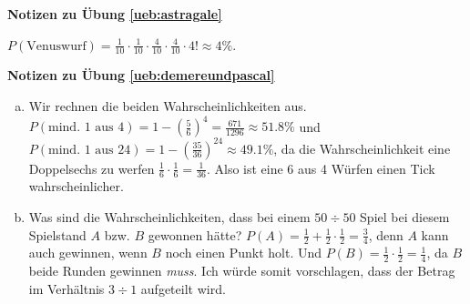 \documentclass[%
<<<<<<< Updated upstream
11pt,%
twoside,%
titlepage,%
german,%
=======
11pt,%
twoside,%
titlepage,%
swissgerman,%
>>>>>>> Stashed changes
headsepline%
]{scrartcl}
\newcommand{\faReturnGray}{\textcolor{gray}{\faMailReply}} %
\theoremstyle{definition}
\theoremstyle{plain}
\newcommand{\concatueb}[1]{ueb:#1}%
\newcommand{\concatlsg}[1]{lsg:#1}%
\newenvironment{lsg}[1]{%
    \par\noindent\textbf{Notizen zu Übung \ref{\concatueb{#1}}}\label{\concatlsg{#1}}
    \hfill\hyperref[\concatueb{#1}]{\faReturnGray}\par %
}{%
    \par%
}
\newcommand{\concatueb}[1]{ueb:#1}%
\newcommand{\concatlsg}[1]{lsg:#1}%
\newenvironment{lsg}[1]{%
    \par\noindent\textbf{Notizen zu Übung \ref{\concatueb{#1}}.}%
    \label{\concatlsg{#1}}
}{%
    \par%
}
\begin{document}
 
 \begin{lsg}{astragale}
$P(\text{Venuswurf})=\frac{1}{10}\cdot\frac{1}{10}\cdot\frac{4}{10}\cdot\frac{4}{10}\cdot4!\approx4\%$.
 \end{lsg}


\begin{lsg}{demereundpascal}
\begin{enumerate}[a)]
\item Wir rechnen die beiden Wahrscheinlichkeiten aus. $P(\text{mind. 1 aus 4})=1-\left(\frac{5}{6}\right)^{4}=\frac{671}{1296}\approx51.8\%$ und $P(\text{mind. 1 aus 24})=1-\left(\frac{35}{36}\right)^{24}\approx49.1\%$, da die Wahrscheinlichkeit eine Doppelsechs zu werfen $\frac{1}{6}\cdot\frac{1}{6}=\frac{1}{36}$. Also ist eine 6 aus 4 W\"urfen einen Tick wahrscheinlicher.
\item Was sind die Wahrscheinlichkeiten, dass bei einem $50\div50$ Spiel bei diesem Spielstand $A$ bzw. $B$ gewonnen h\"atte? $P(A)=\frac{1}{2}+\frac{1}{2}\cdot\frac{1}{2}=\frac{3}{4}$, denn $A$ kann auch gewinnen, wenn $B$ noch einen Punkt holt. Und $P(B)=\frac{1}{2}\cdot\frac{1}{2}=\frac{1}{4}$, da $B$ beide Runden gewinnen \emph{muss}. Ich w\"urde somit vorschlagen, dass der Betrag im Verh\"altnis $3\div1$ aufgeteilt wird.
\end{enumerate}
\end{lsg}
\end{document}
